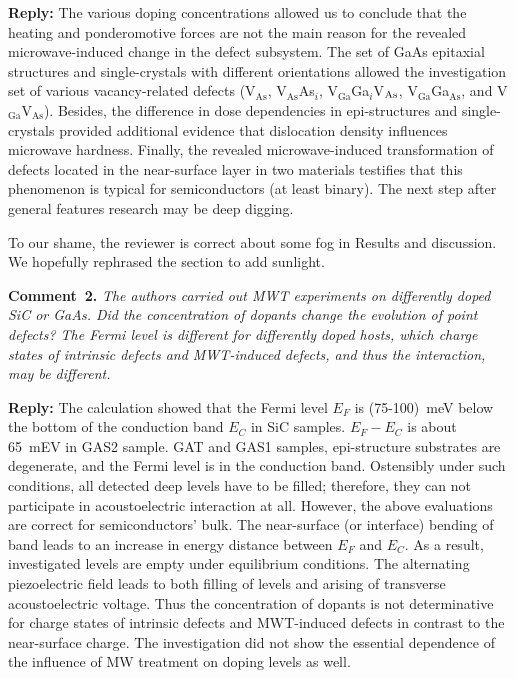 \documentclass[10pt]{iopart}
\begin{document}
\noindent
\textcolor[rgb]{0.51,0.00,0.00}{\textbf{Reply:}}
The various doping concentrations allowed us to conclude
that the heating and ponderomotive forces are not the main reason
for the revealed microwave-induced change in the defect subsystem.
The set of GaAs epitaxial structures and single-crystals with different orientations
allowed the investigation set of various vacancy-related defects
(V$_\mathrm{As}$, V$_\mathrm{As}$As$_i$, V$_\mathrm{Ga}$Ga$_i$V$_{\rm As}$,
V$_\mathrm{Ga}$Ga$_\mathrm{As}$, and V$_\mathrm{Ga}$V$_\mathrm{As}$).
Besides, the difference in dose dependencies in epi-structures and single-crystals
provided additional evidence that dislocation density influences microwave hardness.
Finally, the revealed microwave-induced transformation of
defects located in the near-surface layer in two materials
testifies that this phenomenon is typical for semiconductors (at least binary).
The next step after general features research may be deep digging.

To our shame, the reviewer is correct about some fog in Results and discussion.
We hopefully rephrased the section to add sunlight.



\vspace{1cm}
\noindent
\textcolor[rgb]{0.00,0.50,1.00}{\textbf{Comment~2.}}
\emph{The authors carried out MWT experiments on differently doped SiC or GaAs.
Did the concentration of dopants change the evolution of point defects?
The Fermi level is different for differently doped hosts,
which charge states of intrinsic defects and MWT-induced defects, and thus the interaction, may be different.}

\noindent
\textcolor[rgb]{0.51,0.00,0.00}{\textbf{Reply:}}
The calculation showed that the Fermi level $E_F$ is (75-100)~meV below
the bottom of the conduction band $E_C$ in SiC samples.
$E_F-E_C$ is about 65~mEV in GAS2 sample.
GAT and GAS1 samples, epi-structure substrates are degenerate, and
the Fermi level is in the conduction band.
Ostensibly under such conditions,
all detected deep levels have to be filled;
therefore, they can not participate in acoustoelectric interaction at all.
However, the above evaluations are correct for semiconductors' bulk.
The near-surface (or interface) bending of band leads to an increase in energy distance between
$E_F$ and $E_C$.
As a result, investigated levels  are empty under equilibrium conditions.
The alternating piezoelectric field leads to both filling of levels
and arising of transverse acoustoelectric voltage.
Thus the concentration of dopants is not determinative
for charge states of intrinsic defects and MWT-induced defects
in contrast to the near-surface charge.
The investigation did not show
the essential dependence of the influence of MW treatment on doping levels as well.
\end{document}
